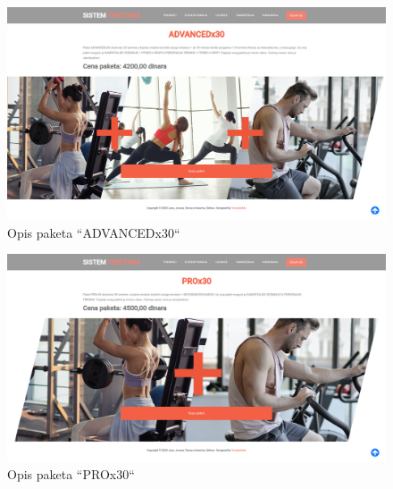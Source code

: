 \documentclass[../main.tex]{subfiles}
\begin{document}
\begin{figure}[!ht]
\begin{center}
\includegraphics[scale=0.22]{sections/korisnicki_interfejs/screenshots/paket_advancedx30_opis_i_kupovina_paketa.png}
\end{center}
\caption{Opis paketa ``ADVANCEDx30``}
\label{fig:paket_a_30}
\end{figure}

\begin{figure}[!ht]
\begin{center}
\includegraphics[scale=0.22]{sections/korisnicki_interfejs/screenshots/paket_prox30_opis_i_kupovina_paketa.png}
\end{center}
\caption{Opis paketa ``PROx30``}
\label{fig:paket_p_30}
\end{figure}
\end{document}
